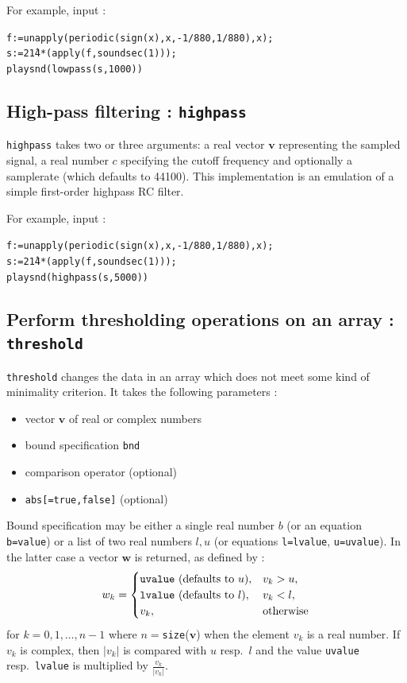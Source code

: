\documentclass[a4paper,11pt]{book}
\begin{document}
For example, input :
\begin{center}
	{\tt f:=unapply(periodic(sign(x),x,-1/880,1/880),x);\\
		s:=2\^14*(apply(f,soundsec(1)));\\
		playsnd(lowpass(s,1000))}
\end{center}

\subsection{High-pass filtering : {\tt highpass}}
{\tt highpass} takes two or three arguments: a real vector $ \mathbf{v} $ representing the sampled signal, a real number $ c $ specifying the cutoff frequency and optionally a samplerate (which defaults to 44100). This implementation is an emulation of a simple first-order highpass RC filter.

For example, input :
\begin{center}
	{\tt f:=unapply(periodic(sign(x),x,-1/880,1/880),x);\\
		s:=2\^14*(apply(f,soundsec(1)));\\
		playsnd(highpass(s,5000))}
\end{center}

\subsection{Perform thresholding operations on an array : {\tt threshold}}
{\tt threshold} changes the data in an array which does not meet some kind of minimality criterion. It takes the following parameters :
\begin{itemize}
	\item vector $ \mathbf{v} $ of real or complex numbers
	\item bound specification {\tt bnd}
	\item comparison operator (optional)
	\item {\tt abs[=true,false]} (optional)
\end{itemize}
Bound specification may be either a single real number $ b $ (or an equation {\tt b=value}) or a list of two real numbers $ l,u $ (or equations {\tt l=lvalue}, {\tt u=uvalue}). In the latter case a vector $ \mathbf{w} $ is returned, as defined by :
\[ w_k=\begin{cases}
\text{{\tt uvalue} (defaults to $ u $)},&v_k>u,\\
\text{{\tt lvalue} (defaults to $ l $)},&v_k<l,\\
v_k,&\text{otherwise}
\end{cases} \]
for $ k=0,1,\dots,n-1 $ where $ n= ${\tt size}($ \mathbf{v} $) when the element $ v_k $ is a real number. If $ v_k $ is complex, then $ |v_k| $ is compared with $ u $ resp.~$ l $ and the value {\tt uvalue} resp.~{\tt lvalue} is multiplied by $ \frac{v_k}{|v_k|} $.
\end{document}
